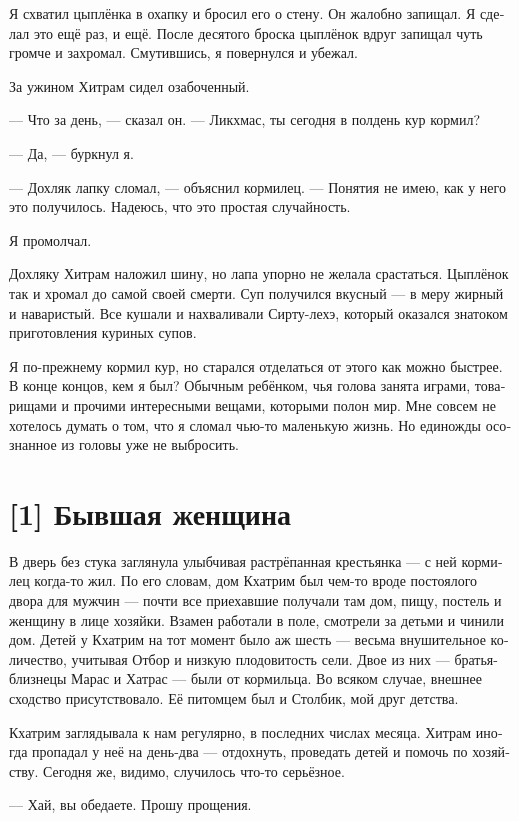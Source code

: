 \documentclass[a4paper,12pt,fleqn]{book}\usepackage{cooltooltips}\usepackage{polyglossia}\setdefaultlanguage[babelshorthands=true]{russian}\setotherlanguage{english}\defaultfontfeatures{Ligatures=TeX,Mapping=tex-text} \usepackage{xcolor}\definecolor{lightgray}{HTML}{bbbbbb}\color{lightgray}\newcommand{\ml}[3]{\textenglish{\textcolor{black}{#3}}}
\begin{document}
{Я схватил цыплёнка в охапку и бросил его о стену.
Он жалобно запищал.
Я сделал это ещё раз, и ещё.
После десятого броска цыплёнок вдруг запищал чуть громче и захромал.
Смутившись, я повернулся и убежал.

За ужином Хитрам сидел озабоченный.

--- Что за день, --- сказал он.
--- Ликхмас, ты сегодня в полдень кур кормил?

--- Да, --- буркнул я.

--- Дохляк лапку сломал, --- объяснил кормилец.
--- Понятия не имею, как у него это получилось.
Надеюсь, что это простая случайность.

Я промолчал.

Дохляку Хитрам наложил шину, но лапа упорно не желала срастаться.
Цыплёнок так и хромал до самой своей смерти.
Суп получился вкусный --- в меру жирный и наваристый.
Все кушали и нахваливали Сирту-лехэ, который оказался знатоком приготовления куриных супов.

Я по-прежнему кормил кур, но старался отделаться от этого как можно быстрее.
В конце концов, кем я был?
Обычным ребёнком, чья голова занята играми, товарищами и прочими интересными вещами, которыми полон мир.
Мне совсем не хотелось думать о том, что я сломал чью-то маленькую жизнь.
Но единожды осознанное из головы уже не выбросить.

\section{[1] Бывшая женщина}

В дверь без стука заглянула улыбчивая растрёпанная крестьянка --- с ней кормилец когда-то жил.
По его словам, дом Кхатрим был чем-то вроде постоялого двора для мужчин --- почти все приехавшие получали там дом, пищу, постель и женщину в лице хозяйки.
Взамен работали в поле, смотрели за детьми и чинили дом.
Детей у Кхатрим на тот момент было аж шесть --- весьма внушительное количество, учитывая Отбор и низкую плодовитость сели.
Двое из них --- братья-близнецы Марас и Хатрас --- были от кормильца.
Во всяком случае, внешнее сходство присутствовало.
Её питомцем был и Столбик, мой друг детства.

Кхатрим заглядывала к нам регулярно, в последних числах месяца.
Хитрам иногда пропадал у неё на день-два --- отдохнуть, проведать детей и помочь по хозяйству.
Сегодня же, видимо, случилось что-то серьёзное.

--- Хай, вы обедаете.
Прошу прощения.

}
\end{document}

